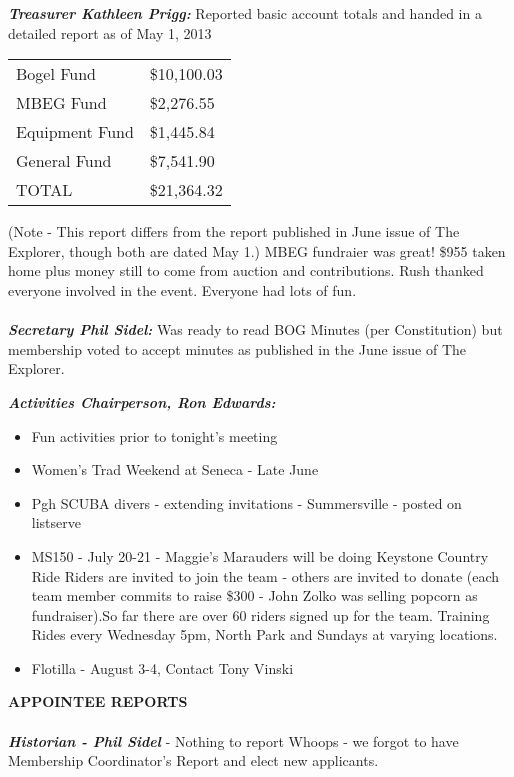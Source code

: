 \documentclass[10pt,a4paper]{article}
\begin{document}
\begin{multicols}{2}
\textit{\textbf{Treasurer Kathleen Prigg:}}    Reported basic account totals and handed in a  detailed  report as of May 1, 2013

\begin{center}
	\begin{tabular}{l l}
	Bogel Fund	&	\$10,100.03 \\
	MBEG Fund	&     \$2,276.55\\
	Equipment Fund	  &   \$1,445.84\\
	General Fund	  &   \$7,541.90\\
		TOTAL &	\$21,364.32
	\end{tabular}
\end{center}
   (Note - This report differs from the report published in June issue of The Explorer, 
    though both are dated May 1.)   MBEG fundraier was great!  \$955 taken home plus money still to come 
   from auction and contributions.  Rush thanked everyone involved in the event.  Everyone had lots of fun.
\\
\\
\textit{\textbf{Secretary Phil Sidel:}}  Was ready to read BOG Minutes (per Constitution) but membership voted to accept minutes as published in the June issue of The Explorer.

\textit{\textbf{Activities Chairperson, Ron Edwards:}}
	\begin{itemize}
\item   Fun activities prior to tonight's meeting
\item   Women's Trad Weekend at Seneca - Late June
\item   Pgh SCUBA divers - extending invitations - Summersville - posted on listserve
\item    MS150 - July 20-21 - Maggie's Marauders will be doing Keystone Country Ride
	Riders are invited to join the team - others are invited to donate (each team 
	member commits to raise \$300 - John Zolko was selling popcorn as fundraiser).So far there are over 60 riders signed up for the team. 	Training Rides every Wednesday 5pm, North Park and Sundays at varying locations.  
\item   Flotilla - August 3-4, Contact Tony Vinski
	\end{itemize}


\textbf{APPOINTEE REPORTS}
\\
\\
 \textit{  \textbf{Historian - Phil Sidel}} - Nothing to report
   Whoops - we forgot to have Membership Coordinator's Report 
	and elect new applicants.


\end{multicols}
\end{document}
